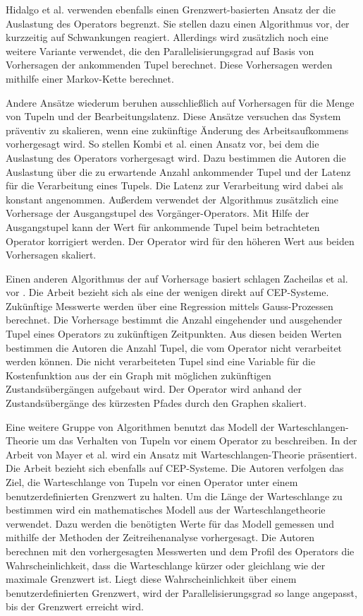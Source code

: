 Hidalgo et al. \cite{hidalgo_self-adaptive_2017} verwenden ebenfalls einen Grenzwert-basierten Ansatz der die Auslastung des Operators begrenzt.
Sie stellen dazu einen Algorithmus vor, der kurzzeitig auf Schwankungen reagiert.
Allerdings wird zusätzlich noch eine weitere Variante verwendet, die den Parallelisierungsgrad auf Basis von Vorhersagen der ankommenden Tupel berechnet.
Diese Vorhersagen werden mithilfe einer Markov-Kette berechnet.

Andere Ansätze wiederum beruhen ausschließlich auf Vorhersagen für die Menge von Tupeln und der Bearbeitungslatenz.
Diese Ansätze versuchen das System präventiv zu skalieren, wenn eine zukünftige Änderung des Arbeitsaufkommens vorhergesagt wird.
So stellen Kombi et al. \cite{kombi_preventive_2017} einen Ansatz vor, bei dem die Auslastung des Operators vorhergesagt wird.
Dazu bestimmen die Autoren die Auslastung über die zu erwartende Anzahl ankommender Tupel und der Latenz für die Verarbeitung eines Tupels.
Die Latenz zur Verarbeitung wird dabei als konstant angenommen.
Außerdem verwendet der Algorithmus zusätzlich eine Vorhersage der Ausgangstupel des Vorgänger-Operators.
Mit Hilfe der Ausgangstupel kann der Wert für ankommende Tupel beim betrachteten Operator korrigiert werden.
Der Operator wird für den höheren Wert aus beiden Vorhersagen skaliert.

Einen anderen Algorithmus der auf Vorhersage basiert schlagen Zacheilas et al. vor \cite{zacheilas_elastic_2015}.
Die Arbeit bezieht sich als eine der wenigen direkt auf CEP-Systeme.
Zukünftige Messwerte werden über eine Regression mittels Gauss-Prozessen berechnet.
Die Vorhersage bestimmt die Anzahl eingehender und ausgehender Tupel eines Operators zu zukünftigen Zeitpunkten.
Aus diesen beiden Werten bestimmen die Autoren die Anzahl Tupel, die vom Operator nicht verarbeitet werden können.
Die nicht verarbeiteten Tupel sind eine Variable für die Kostenfunktion aus der ein Graph mit möglichen zukünftigen Zustandsübergängen aufgebaut wird.
Der Operator wird anhand der Zustandsübergänge des kürzesten Pfades durch den Graphen skaliert.

Eine weitere Gruppe von Algorithmen benutzt das Modell der Warteschlangen-Theorie um das Verhalten von Tupeln vor einem Operator zu beschreiben.
In der Arbeit von Mayer et al. \cite{mayer_predictable_2015} wird ein Ansatz mit Warteschlangen-Theorie präsentiert.
Die Arbeit bezieht sich ebenfalls auf CEP-Systeme.
Die Autoren verfolgen das Ziel, die Warteschlange von Tupeln vor einen Operator unter einem benutzerdefinierten Grenzwert zu halten.
Um die Länge der Warteschlange zu bestimmen wird ein mathematisches Modell aus der Warteschlangetheorie verwendet.
Dazu werden die benötigten Werte für das Modell gemessen und mithilfe der Methoden der Zeitreihenanalyse vorhergesagt.
Die Autoren berechnen mit den vorhergesagten Messwerten und dem Profil des Operators die Wahrscheinlichkeit, dass die Warteschlange kürzer oder gleichlang wie der maximale Grenzwert ist.
Liegt diese Wahrscheinlichkeit über einem benutzerdefinierten Grenzwert, wird der Parallelisierungsgrad so lange angepasst, bis der Grenzwert erreicht wird.

